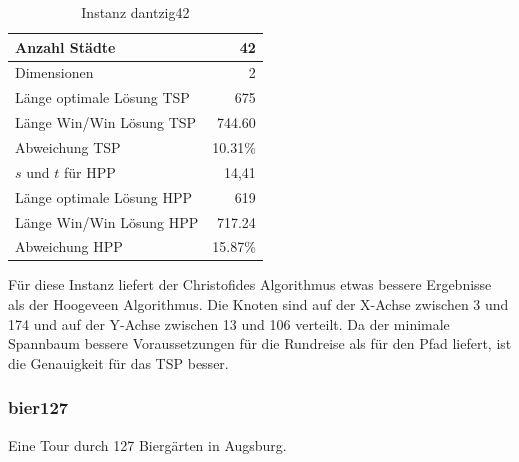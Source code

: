 \documentclass[11pt,a4paper]{article}
\begin{document}
        \begin{table}[H]
                \centering
                \begin{tabular}{| l | r |}
                    \hline
                        Anzahl Städte               & 42            \\ \hline
                        Dimensionen                 & 2             \\ \hline
                        Länge optimale Lösung TSP   & 675           \\ \hline
                        Länge Win/Win Lösung  TSP   & 744.60        \\ \hline
                        Abweichung TSP              & 10.31\%       \\ \hline
                        $s$ und $t$ für HPP         & 14,41         \\ \hline
                        Länge optimale Lösung HPP   & 619           \\ \hline
                        Länge Win/Win Lösung  HPP   & 717.24        \\ \hline
                        Abweichung HPP              & 15.87\%       \\ \hline
                \end{tabular}
                \caption{Instanz dantzig42}
                \label{tab:dantzig42}
        \end{table}

Für diese Instanz liefert der Christofides Algorithmus etwas bessere Ergebnisse als der Hoogeveen Algorithmus. Die Knoten sind auf der X-Achse zwischen 3 und 174 und auf der Y-Achse zwischen 13 und 106 verteilt. Da der minimale Spannbaum bessere Voraussetzungen für die Rundreise als für den Pfad liefert, ist die Genauigkeit für das TSP besser.

\subsubsection{bier127}
Eine Tour durch 127 Biergärten in Augsburg.
\end{document}
